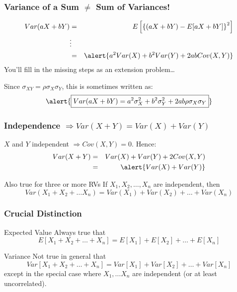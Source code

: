 \begin{frame}
\frametitle{Variance of a Sum $\neq$ Sum of Variances!}
\begin{eqnarray*}
	Var(aX + bY) &=& E\left[\left\{\left( aX + bY\right) - E[aX + bY]\right\}^2  \right]\\ %
  &\vdots& \\
	&=& \alert{a^2 Var(X) + b^2 Var(Y) + 2ab Cov(X,Y)}
\end{eqnarray*}
You'll fill in the missing steps as an extension problem\dots


\vspace{2em}
Since $\sigma_{XY} = \rho\sigma_X \sigma_Y$, this is sometimes written as:
$$\alert{\boxed{Var(aX + bY) = a^2 \sigma_X^2 + b^2 \sigma_Y^2 + 2ab \rho \sigma_X \sigma_Y}}$$
\end{frame}
\begin{frame}
\frametitle{Independence $\Rightarrow Var(X+Y) = Var(X) + Var(Y)$}

$X$ and $Y$ independent $\Rightarrow Cov(X,Y)=0$. Hence:
\begin{eqnarray*}
	Var(X + Y) &=& Var(X) + Var(Y) + 2 Cov(X,Y)\\
			&=& \alert{Var(X) +Var(Y)}
\end{eqnarray*}


\begin{block}{Also true for three or more RVs}
If $X_1, X_2, \hdots, X_n$ are independent, then
	$$Var(X_1 + X_2 + \hdots X_n) = Var(X_1) + Var(X_2) + \hdots + Var(X_n)$$
\end{block}

\end{frame}
\begin{frame}
\frametitle{Crucial Distinction}
\begin{block}{Expected Value}
\alert{Always} true that
	$$E[X_1 + X_2 + \hdots + X_n] = E[X_1] + E[X_2] + \hdots + E[X_n]$$
\end{block}


\begin{block}{Variance}
\alert{Not true in general} that 
	$$Var[X_1 + X_2 + \hdots + X_n] = Var[X_1] + Var[X_2] + \hdots + Var[X_n]$$
except in the special case where $X_1, \hdots X_n$ are independent (or at least uncorrelated).
\end{block}
\end{frame}


